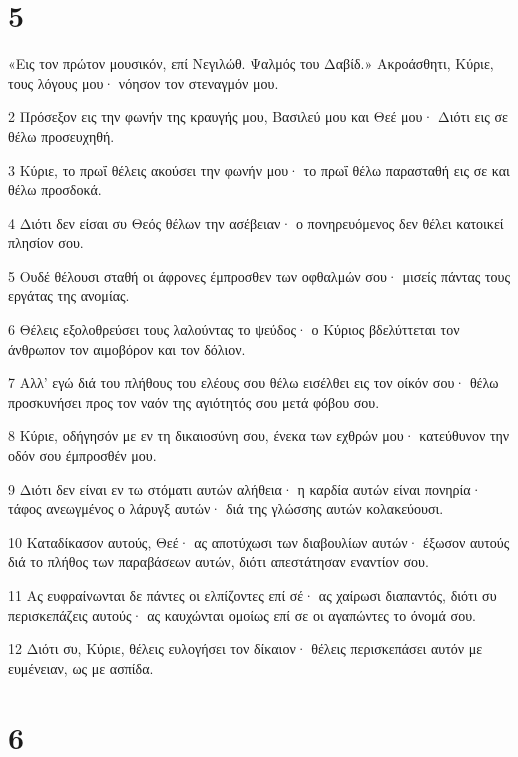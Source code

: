 \chapter{5}

\par «Εις τον πρώτον μουσικόν, επί Νεγιλώθ. Ψαλμός του Δαβίδ.» Ακροάσθητι, Κύριε, τους λόγους μου· νόησον τον στεναγμόν μου.
\par 2 Πρόσεξον εις την φωνήν της κραυγής μου, Βασιλεύ μου και Θεέ μου· Διότι εις σε θέλω προσευχηθή.
\par 3 Κύριε, το πρωΐ θέλεις ακούσει την φωνήν μου· το πρωΐ θέλω παρασταθή εις σε και θέλω προσδοκά.
\par 4 Διότι δεν είσαι συ Θεός θέλων την ασέβειαν· ο πονηρευόμενος δεν θέλει κατοικεί πλησίον σου.
\par 5 Ουδέ θέλουσι σταθή οι άφρονες έμπροσθεν των οφθαλμών σου· μισείς πάντας τους εργάτας της ανομίας.
\par 6 Θέλεις εξολοθρεύσει τους λαλούντας το ψεύδος· ο Κύριος βδελύττεται τον άνθρωπον τον αιμοβόρον και τον δόλιον.
\par 7 Αλλ' εγώ διά του πλήθους του ελέους σου θέλω εισέλθει εις τον οίκόν σου· θέλω προσκυνήσει προς τον ναόν της αγιότητός σου μετά φόβου σου.
\par 8 Κύριε, οδήγησόν με εν τη δικαιοσύνη σου, ένεκα των εχθρών μου· κατεύθυνον την οδόν σου έμπροσθέν μου.
\par 9 Διότι δεν είναι εν τω στόματι αυτών αλήθεια· η καρδία αυτών είναι πονηρία· τάφος ανεωγμένος ο λάρυγξ αυτών· διά της γλώσσης αυτών κολακεύουσι.
\par 10 Καταδίκασον αυτούς, Θεέ· ας αποτύχωσι των διαβουλίων αυτών· έξωσον αυτούς διά το πλήθος των παραβάσεων αυτών, διότι απεστάτησαν εναντίον σου.
\par 11 Ας ευφραίνωνται δε πάντες οι ελπίζοντες επί σέ· ας χαίρωσι διαπαντός, διότι συ περισκεπάζεις αυτούς· ας καυχώνται ομοίως επί σε οι αγαπώντες το όνομά σου.
\par 12 Διότι συ, Κύριε, θέλεις ευλογήσει τον δίκαιον· θέλεις περισκεπάσει αυτόν με ευμένειαν, ως με ασπίδα.

\chapter{6}

